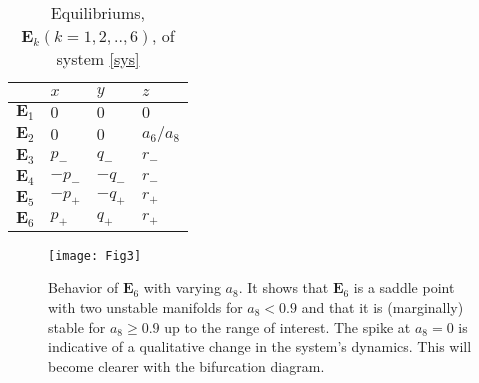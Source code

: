 \documentclass[final,5p,times,twocolumn]{elsarticle}
\begin{document}
\begin{table}[htbp]
	\centering
	\caption{Equilibriums, $\bm{E}_k (k=1,2,..,6)$, of system \eqref{sys}}	
	\label{equtb}	
	\begin{tabular}{ |l|l|l|l| }				
		\hline
		$ $ & $x $& $y $ & $z$ \\
		\hline
		$\bm{E}_1 $ & $0 $& $ 0$ & $0 $ \\
		\hline
		$\bm{E}_2$ & $ 0$& $0 $ & $a_6/a_8 $\\
		\hline				
		$\bm{E}_3$ & $p_{-} $& $ q_{-}$ & $r_-$\\
		\hline
		$\bm{E}_4$ & $-p_{-} $& $ -q_{-}$ & $r_- $\\
		\hline				
		$\bm{E}_5$ & $-p_{+} $& $ -q_{+}$ & $r_+ $\\
		\hline
		$\bm{E}_6$ & $p_{+} $& $ q_{+}$ & $r_+ $\\
		\hline				
	\end{tabular}
\end{table}
\begin{figure}[htbp]
	\texttt{[image: Fig3]}
	\caption{Behavior of $\bm{E}_6$ with varying $a_8$. It shows that $\bm{E}_6$ is a saddle point with two unstable manifolds for $a_8<0.9$ and that it is (marginally) stable for $a_8\ge 0.9$ up to the range of interest. The spike at $a_8=0$ is indicative of a qualitative change in the system's dynamics. This will become clearer with the bifurcation diagram.}
	\label{stability}
\end{figure}
\end{document}
